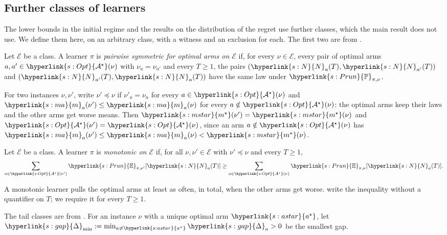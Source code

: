 \documentclass[11pt]{article}
\newcommand{\E}{\mathbb{E}}
\newcommand{\Prob}{\mathbb{P}}
\newcommand{\dt}[1]{\hypertarget{#1}{}}
\newcommand{\sy}[2]{{\hyperlink{#1}{#2}}}
\newcommand{\marm}{\sy{s:ma}{m}}
\newcommand{\ms}{\sy{s:mstar}{m^{\star}}}
\newcommand{\gap}{\sy{s:gap}{\Delta}}
\newcommand{\Opt}{\sy{s:Opt}{\mathcal{A}^{\star}}}
\newcommand{\Pru}{\sy{s:Prun}{\Prob}}
\newcommand{\Er}{\sy{s:Prun}{\E}}
\newcommand{\Np}{\sy{s:N}{N}}
\newcommand{\as}{\sy{s:astar}{a^{\star}}}
\begin{document}
\subsection{Further classes of learners}

The lower bounds in the initial regime and the results on the distribution of the regret use
further classes, which the main result does not use. We define them here, on an arbitrary class, with
a witness and an exclusion for each. The first two are from \citet[Definitions~3 and~4]{GMS19}.

\begin{definition}\label{def:pairwise}
Let $\mathcal E$ be a class. \dt{w:pairwise}A learner $\pi$ is \emph{pairwise symmetric for optimal
arms on $\mathcal E$} if, for every $\nu\in\mathcal E$, every pair of optimal arms $a,a'\in\Opt(\nu)$
with $\nu_a=\nu_{a'}$ and every $T\ge1$, the pairs $(\Np_a(T),\Np_{a'}(T))$ and
$(\Np_{a'}(T),\Np_a(T))$ have the same law under $\Pru_{\pi,\nu}$.
\end{definition}

\dt{s:preceq}For two instances $\nu,\nu'$, write $\nu'\preccurlyeq\nu$ if $\nu'_a=\nu_a$ for every
$a\in\Opt(\nu)$ and $\marm_a(\nu')\le\marm_a(\nu)$ for every $a\notin\Opt(\nu)$: the optimal arms keep
their laws and the other arms get worse means. Then $\ms(\nu')=\ms(\nu)$ and
$\Opt(\nu')=\Opt(\nu)$, since an arm $a\notin\Opt(\nu)$ has $\marm_a(\nu')\le\marm_a(\nu)<\ms(\nu)$.

\begin{definition}\label{def:monotonic}
Let $\mathcal E$ be a class. \dt{w:monotonic}A learner $\pi$ is \emph{monotonic on $\mathcal E$} if,
for all $\nu,\nu'\in\mathcal E$ with $\nu'\preccurlyeq\nu$ and every $T\ge1$,
\begin{equation*}
  \sum_{a\in\Opt(\nu')}\Er_{\pi,\nu'}[\Np_a(T)]\ge\sum_{a\in\Opt(\nu)}\Er_{\pi,\nu}[\Np_a(T)].
\end{equation*}
\end{definition}

A monotonic learner pulls the optimal arms at least as often, in total, when the other arms get
worse. \citet[Definition~4]{GMS19} write the inequality without a quantifier on $T$; we require it
for every $T\ge1$.

The tail classes are from \citet[Definition~1]{SA11}. \dt{s:dmin}For an instance $\nu$ with a unique
optimal arm $\as$, let $\gap_{\min}:=\min_{a\ne\as}\gap_a>0$ be the smallest gap.
\end{document}
